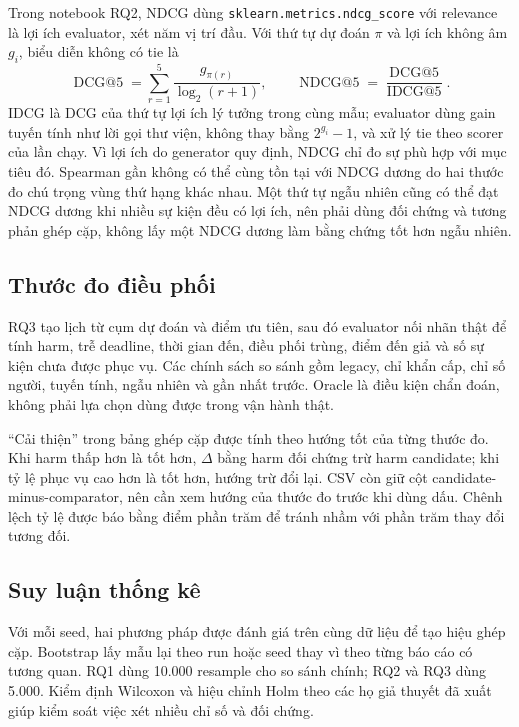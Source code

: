 Trong notebook RQ2, NDCG dùng \texttt{sklearn.metrics.ndcg\_score} với relevance là lợi ích evaluator, xét năm vị trí đầu. Với thứ tự dự đoán $\pi$ và lợi ích không âm $g_i$, biểu diễn không có tie là
\begin{equation}
\operatorname{DCG@5}=\sum_{r=1}^{5}\frac{g_{\pi(r)}}{\log_2(r+1)},\qquad
\operatorname{NDCG@5}=\frac{\operatorname{DCG@5}}{\operatorname{IDCG@5}}.
\end{equation}
IDCG là DCG của thứ tự lợi ích lý tưởng trong cùng mẫu; evaluator dùng gain tuyến tính như lời gọi thư viện, không thay bằng $2^{g_i}-1$, và xử lý tie theo scorer của lần chạy. Vì lợi ích do generator quy định, NDCG chỉ đo sự phù hợp với mục tiêu đó. Spearman gần không có thể cùng tồn tại với NDCG dương do hai thước đo chú trọng vùng thứ hạng khác nhau. Một thứ tự ngẫu nhiên cũng có thể đạt NDCG dương khi nhiều sự kiện đều có lợi ích, nên phải dùng đối chứng và tương phản ghép cặp, không lấy một NDCG dương làm bằng chứng tốt hơn ngẫu nhiên.

\subsection{Thước đo điều phối}
RQ3 tạo lịch từ cụm dự đoán và điểm ưu tiên, sau đó evaluator nối nhãn thật để tính harm, trễ deadline, thời gian đến, điều phối trùng, điểm đến giả và số sự kiện chưa được phục vụ. Các chính sách so sánh gồm legacy, chỉ khẩn cấp, chỉ số người, tuyến tính, ngẫu nhiên và gần nhất trước. Oracle là điều kiện chẩn đoán, không phải lựa chọn dùng được trong vận hành thật.

``Cải thiện'' trong bảng ghép cặp được tính theo hướng tốt của từng thước đo. Khi harm thấp hơn là tốt hơn, $\Delta$ bằng harm đối chứng trừ harm candidate; khi tỷ lệ phục vụ cao hơn là tốt hơn, hướng trừ đổi lại. CSV còn giữ cột candidate-minus-comparator, nên cần xem hướng của thước đo trước khi dùng dấu. Chênh lệch tỷ lệ được báo bằng điểm phần trăm để tránh nhầm với phần trăm thay đổi tương đối.

\subsection{Suy luận thống kê}
Với mỗi seed, hai phương pháp được đánh giá trên cùng dữ liệu để tạo hiệu ghép cặp. Bootstrap lấy mẫu lại theo run hoặc seed thay vì theo từng báo cáo có tương quan. RQ1 dùng 10.000 resample cho so sánh chính; RQ2 và RQ3 dùng 5.000. Kiểm định Wilcoxon và hiệu chỉnh Holm theo các họ giả thuyết đã xuất giúp kiểm soát việc xét nhiều chỉ số và đối chứng.

